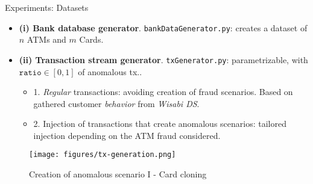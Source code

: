 \begin{frame}{Experiments: Datasets}
\begin{itemize}
    \item \textbf{(i) Bank database generator}. \texttt{bankDataGenerator.py}: creates a dataset of $n$ ATMs and $m$ Cards.
    \vspace{0.4em}
    \item \textbf{(ii) Transaction stream generator}. \texttt{txGenerator.py}: parametrizable, with $\texttt{ratio} \in [0,1]$ of anomalous tx..
    \vspace{0.2em}
    \begin{itemize}
        \item 1. \emph{Regular} transactions: avoiding creation of fraud scenarios. Based on gathered customer \emph{behavior} from \emph{Wisabi DS}.
        \vspace{0.3em}
        \item 2. Injection of transactions that create anomalous scenarios: tailored injection depending on the ATM fraud considered.
    \end{itemize}
\end{itemize}
\begin{figure}
    \centering
    \texttt{[image: figures/tx-generation.png]}
    \caption{Creation of anomalous scenario I - Card cloning}
\end{figure}
\end{frame}

\begin{comment}
\begin{frame}{Experiments: Datasets}

\begin{itemize}
    \item 1. Generation of \emph{regular} transactions: ensuring that do not create fraud scenarios. 
    \item 2. Injection of transactions that create anomalous scenarios: \textcolor{red}{taylored injection} depending on the ATM fraud considered.
\end{itemize}
\begin{figure}
    \centering
    \texttt{[image: figures/tx-generation.png]}
    \caption{Creation of anomalous scenario I - Card cloning}
\end{figure}
\end{frame}
\end{comment}

